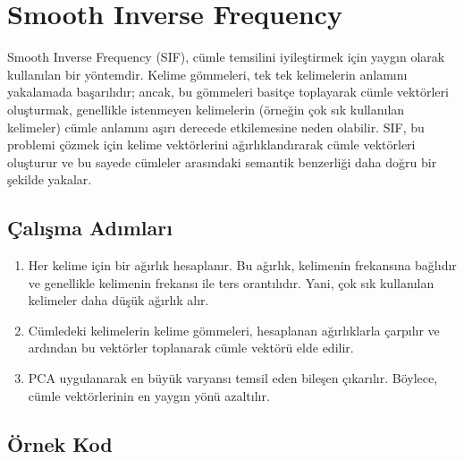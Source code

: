 \section{Smooth Inverse Frequency}

Smooth Inverse Frequency (SIF), cümle temsilini iyileştirmek için yaygın olarak kullanılan bir yöntemdir. Kelime gömmeleri, tek tek kelimelerin anlamını yakalamada başarılıdır; ancak, bu gömmeleri basitçe toplayarak cümle vektörleri oluşturmak, genellikle istenmeyen kelimelerin (örneğin çok sık kullanılan kelimeler) cümle anlamını aşırı derecede etkilemesine neden olabilir. SIF, bu problemi çözmek için kelime vektörlerini ağırlıklandırarak cümle vektörleri oluşturur ve bu sayede cümleler arasındaki semantik benzerliği daha doğru bir şekilde yakalar.

\subsection{Çalışma Adımları}

\begin{enumerate}
    \item Her kelime için bir ağırlık hesaplanır. Bu ağırlık, kelimenin frekansına bağlıdır ve genellikle kelimenin frekansı ile ters orantılıdır. Yani, çok sık kullanılan kelimeler daha düşük ağırlık alır.
    \item Cümledeki kelimelerin kelime gömmeleri, hesaplanan ağırlıklarla çarpılır ve ardından bu vektörler toplanarak cümle vektörü elde edilir.
    \item PCA uygulanarak en büyük varyansı temsil eden bileşen çıkarılır. Böylece, cümle vektörlerinin en yaygın yönü azaltılır.
\end{enumerate}

\subsection{Örnek Kod}

